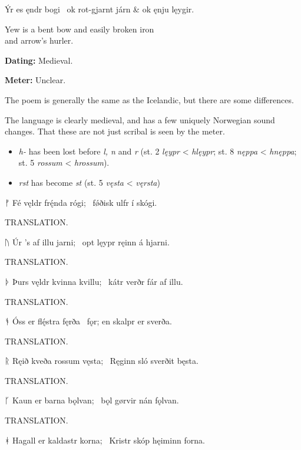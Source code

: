 \bvg\bva Ýr es ęndr bogi \hld\ ok rot-gjarnt járn &
\ind ok ęnju lęygir.\eva

\bvb Yew is a bent bow and easily broken iron \\
and arrow’s hurler.\evb\evg

\sectionline


\begin{flushright}%
\textbf{Dating:} Medieval.%

\textbf{Meter:} Unclear.
\end{flushright}%

The poem is generally the same as the Icelandic, but there are some differences.

The language is clearly medieval, and has a few uniquely Norwegian sound changes.  That these are not just scribal is seen by the meter.
\begin{itemize}
  \item \emph{h-} has been lost before \emph{l, n} and \emph{r} (st. 2 \emph{lęypr} < \emph{hlęypr}; st. 8 \emph{nęppa} < \emph{hnęppa}; st. 5 \emph{rossum} < \emph{hrossum}).
  \item \emph{rst} has become \emph{st} (st. 5 \emph{vęsta} < \emph{vęrsta})
\end{itemize}

\sectionline

\bvg\bva ᚠ Fé vęldr frę́nda rógi; \hld\ fǿðisk ulfr í skógi.\eva

\bvb TRANSLATION.\evb\evg


\bvg\bva ᚢ Úr ’s af illu jarni; \hld\ opt lęypr ręinn á hjarni.\eva

\bvb TRANSLATION.\evb\evg


\bvg\bva ᚦ Þurs vęldr kvinna kvillu; \hld\ kátr verðr fár af illu.\eva

\bvb TRANSLATION.\evb\evg


\bvg\bva ᚬ Óss er flę́stra fęrða \hld\ fǫr; en skalpr er sverða.\eva

\bvb TRANSLATION.\evb\evg


\bvg\bva ᚱ Ręið kveða rossum vęsta; \hld\ Ręginn sló sverðit bęsta.\eva

\bvb TRANSLATION.\evb\evg


\bvg\bva ᚴ Kaun er barna bǫlvan; \hld\ bǫl gørvir nán fǫlvan.\eva

\bvb TRANSLATION.\evb\evg


\bvg\bva ᚼ Hagall er kaldastr korna; \hld\ Kristr skóp hęiminn forna.\eva

